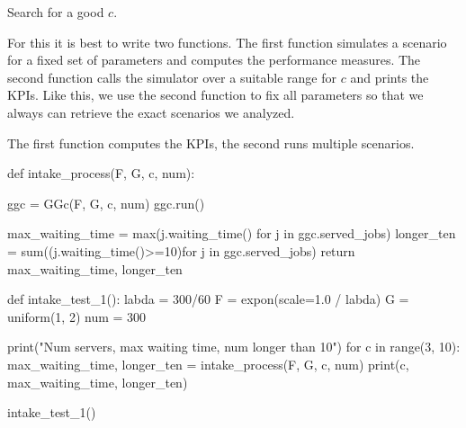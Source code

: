 \begin{exercise}
  Search for a good $c$.

   
   \begin{hint}
  For this it is best to write two functions. The first function simulates a scenario for a fixed set of parameters and computes the performance measures. The second  function calls the simulator over a suitable range for $c$ and prints the KPIs. Like this, we use  the second function to fix all parameters so that we always can retrieve the exact scenarios we analyzed. 
   \end{hint}

  \begin{solution}
The first function computes the KPIs, the second runs multiple scenarios. 

    \begin{pyverbatim}
def intake_process(F, G, c, num):

    ggc = GGc(F, G, c, num)
    ggc.run()

    max_waiting_time = max(j.waiting_time() for j in ggc.served_jobs)
    longer_ten = sum((j.waiting_time()>=10)for j in ggc.served_jobs)
    return max_waiting_time, longer_ten


def intake_test_1():
    labda = 300/60
    F = expon(scale=1.0 / labda)
    G = uniform(1, 2)
    num = 300

    print("Num servers, max waiting time, num longer than 10")
    for c in range(3, 10):
        max_waiting_time, longer_ten = intake_process(F, G, c, num)
        print(c, max_waiting_time, longer_ten)

      
intake_test_1()

    \end{pyverbatim}
  \end{solution}
  
\end{exercise}

